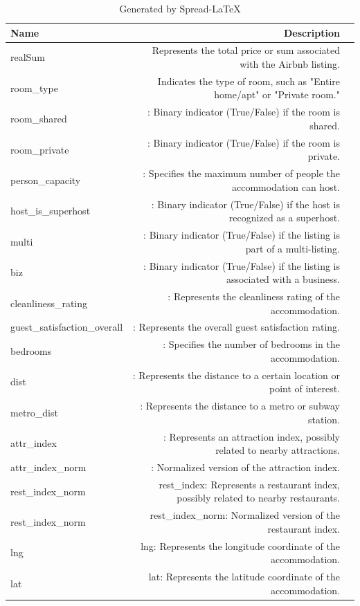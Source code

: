 \documentclass[10pt, conference, compsocconf]{IEEEtran}
\begin{document}
\begin{table}[!htp]\centering
  \caption{Generated by Spread-LaTeX}\label{tab: }
  \scriptsize
  \begin{tabular}{lrr}\toprule
  Name &Description \\\midrule
  realSum &Represents the total price or sum associated with the Airbnb listing. \\
  room\_type &Indicates the type of room, such as "Entire home/apt" or "Private room." \\
  room\_shared &: Binary indicator (True/False) if the room is shared. \\
  room\_private &: Binary indicator (True/False) if the room is private. \\
  person\_capacity &: Specifies the maximum number of people the accommodation can host. \\
  host\_is\_superhost &: Binary indicator (True/False) if the host is recognized as a superhost. \\
  multi &: Binary indicator (True/False) if the listing is part of a multi-listing. \\
  biz &: Binary indicator (True/False) if the listing is associated with a business. \\
  cleanliness\_rating &: Represents the cleanliness rating of the accommodation. \\
  guest\_satisfaction\_overall &: Represents the overall guest satisfaction rating. \\
  bedrooms &: Specifies the number of bedrooms in the accommodation. \\
  dist &: Represents the distance to a certain location or point of interest. \\
  metro\_dist &: Represents the distance to a metro or subway station. \\
  attr\_index &: Represents an attraction index, possibly related to nearby attractions. \\
  attr\_index\_norm &: Normalized version of the attraction index. \\
  rest\_index\_norm &rest\_index: Represents a restaurant index, possibly related to nearby restaurants. \\
  rest\_index\_norm &rest\_index\_norm: Normalized version of the restaurant index. \\
  lng &lng: Represents the longitude coordinate of the accommodation. \\
  lat &lat: Represents the latitude coordinate of the accommodation. \\
  \bottomrule
  \end{tabular}
\end{table}
\end{document}
